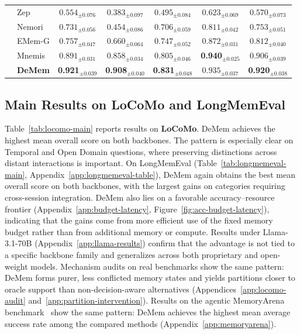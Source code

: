 \documentclass{article}
\theoremstyle{plain}
\theoremstyle{definition}
\theoremstyle{remark}
\begin{document}
\begin{table}[t]
{\begin{tabular}{llccccc}
& Zep         & $0.554_{\pm 0.076}$ & $0.383_{\pm 0.097}$ & $0.495_{\pm 0.084}$ & $0.623_{\pm 0.069}$ & $0.570_{\pm 0.073}$ \\
& Nemori      & $0.731_{\pm 0.056}$ & $0.454_{\pm 0.086}$ & $0.706_{\pm 0.059}$ & $0.811_{\pm 0.042}$ & $0.753_{\pm 0.051}$ \\
& EMem-G      & $0.757_{\pm 0.047}$ & $0.660_{\pm 0.064}$ & $0.747_{\pm 0.052}$ & $0.872_{\pm 0.031}$ & $0.812_{\pm 0.040}$ \\
& Mnemis      & $0.891_{\pm 0.031}$ & $0.858_{\pm 0.034}$ & $0.805_{\pm 0.046}$ & \textbf{0.940}$_{\pm 0.025}$ & $0.906_{\pm 0.039}$ \\
& \textbf{DeMem}
  & \textbf{0.921}$_{\pm 0.039}$
  & \textbf{0.908}$_{\pm 0.040}$
  & \textbf{0.831}$_{\pm 0.048}$
  & $0.935_{\pm 0.037}$
  & \textbf{0.920}$_{\pm 0.038}$ \\
\bottomrule
\end{tabular}
}
\end{table}

\vspace{-0.3em}
\subsection{Main Results on LoCoMo and LongMemEval}
\vspace{-0.3em}
Table~\ref{tab:locomo-main} reports results on \textbf{LoCoMo}.
DeMem achieves the highest mean overall score on both backbones.
The pattern is especially clear on Temporal and Open Domain questions, where
preserving distinctions across distant interactions is important.
On LongMemEval (Table~\ref{tab:longmemeval-main}, Appendix~\ref{app:longmemeval-table}),
 DeMem again obtains the best mean overall score on both backbones,
with the largest gains on categories requiring cross-session integration.
DeMem also lies on a favorable accuracy--resource frontier
(Appendix~\ref{app:budget-latency}, Figure~\ref{fig:acc-budget-latency}),
indicating that the gains come from more efficient use of the fixed memory
budget rather than from additional memory or compute.
Results under Llama-3.1-70B (Appendix~\ref{app:llama-results}) confirm that
the advantage is not tied to a specific backbone family and generalizes
across both proprietary and open-weight models.
Mechanism audits on real benchmarks show the same pattern: DeMem
forms purer, less conflicted memory states and yields partitions closer to
oracle support than non-decision-aware alternatives
(Appendices~\ref{app:locomo-audit} and~\ref{app:partition-intervention}). Results on the agentic MemoryArena benchmark~\citep{he2026memoryarenabenchmarkingagentmemory}
show the same pattern: DeMem achieves the highest mean average success rate among the compared methods
(Appendix~\ref{app:memoryarena}).
\vspace{-0.3em}
\end{document}
